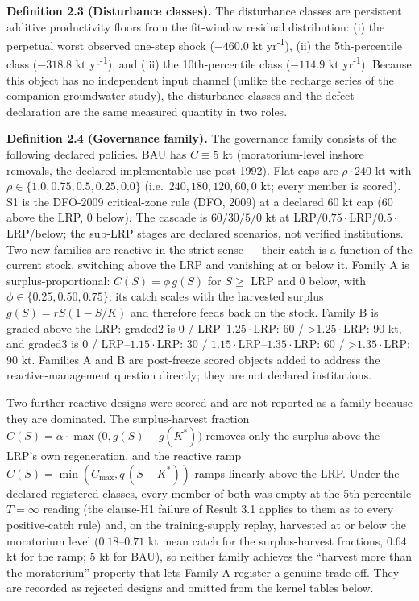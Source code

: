 \documentclass[11pt]{article}
\begin{document}
\textbf{Definition 2.3 (Disturbance classes).} The disturbance classes
are persistent additive productivity floors from the fit-window residual
distribution: (i) the perpetual worst observed one-step shock
(\(-460.0\) kt yr\textsuperscript{-1}), (ii) the 5th-percentile class (\(-318.8\) kt
yr\textsuperscript{-1}), and (iii) the 10th-percentile class (\(-114.9\) kt yr\textsuperscript{-1}). Because
this object has no independent input channel (unlike the recharge series
of the companion groundwater study), the disturbance classes and the
defect declaration are the same measured quantity in two roles.

\textbf{Definition 2.4 (Governance family).} The governance family
consists of the following declared policies. BAU has \(C \equiv 5\) kt
(moratorium-level inshore removals, the declared implementable use
post-1992). Flat caps are \(\rho \cdot 240\) kt with
\(\rho \in \{1.0, 0.75, 0.5, 0.25, 0.0\}\)
(i.e.~\(240, 180, 120, 60, 0\) kt; every member is scored). S1 is the
DFO-2009 critical-zone rule (DFO, 2009) at a declared \(60\) kt cap
(\(60\) above the LRP, \(0\) below). The cascade is \(60/30/5/0\) kt at
LRP/\(0.75\cdot\)LRP/\(0.5\cdot\)LRP/below; the sub-LRP stages are
declared scenarios, not verified institutions. Two new families are
reactive in the strict sense --- their catch is a function of the
current stock, switching above the LRP and vanishing at or below it.
Family A is surplus-proportional: \(C(S) = \phi\, g(S)\) for \(S \ge\)
LRP and 0 below, with \(\phi \in \{0.25, 0.50, 0.75\}\); its catch
scales with the harvested surplus \(g(S) = rS(1 - S/K)\) and therefore
feeds back on the stock. Family B is graded above the LRP: graded2 is 0
/ LRP--\(1.25\cdot\)LRP: 60 / \textgreater{}\(1.25\cdot\)LRP: 90 kt, and
graded3 is 0 / LRP--\(1.15\cdot\)LRP: 30 /
\(1.15\cdot\)LRP--\(1.35\cdot\)LRP: 60 / \textgreater{}\(1.35\cdot\)LRP:
90 kt. Families A and B are post-freeze scored objects added to address
the reactive-management question directly; they are not declared
institutions.

Two further reactive designs were scored and are not reported as a
family because they are dominated. The surplus-harvest fraction
\(C(S) = \alpha\cdot\max\bigl(0, g(S) - g(K^*)\bigr)\) removes only the
surplus above the LRP's own regeneration, and the reactive ramp
\(C(S) = \min(C_{\max}, q\,(S - K^*))\) ramps linearly above the LRP.
Under the declared registered classes, every member of both was empty
at the 5th-percentile \(T=\infty\) reading (the clause-H1 failure of
Result 3.1 applies to them as to every positive-catch rule) and, on the
training-supply replay, harvested at or below the moratorium level
(\(0.18\)--\(0.71\) kt mean catch for the surplus-harvest fractions,
\(0.64\) kt for the ramp; \(5\) kt for BAU), so neither family achieves
the ``harvest more than the moratorium'' property that lets Family A
register a genuine trade-off. They are recorded as rejected designs and
omitted from the kernel tables below.
\end{document}
